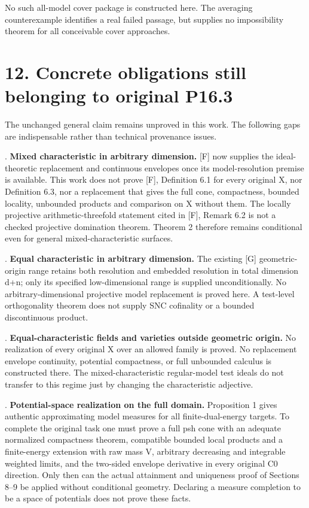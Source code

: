 \documentclass[11pt]{article}
\begin{document}
No such all-model cover package is constructed here. The averaging counterexample identifies a real failed passage, but supplies no impossibility theorem for all conceivable cover approaches.

\section*{12. Concrete obligations still belonging to original P16.3}

The unchanged general claim remains unproved in this work. The following gaps are indispensable rather than technical provenance issues.

. \textbf{Mixed characteristic in arbitrary dimension.} [F] now supplies the ideal-theoretic replacement and continuous envelopes once its model-resolution premise is available. This work does not prove [F], Definition 6.1 for every original X, nor Definition 6.3, nor a replacement that gives the full cone, compactness, bounded locality, unbounded products and comparison on X without them. The locally projective arithmetic-threefold statement cited in [F], Remark 6.2 is not a checked projective domination theorem. Theorem 2 therefore remains conditional even for general mixed-characteristic surfaces.

. \textbf{Equal characteristic in arbitrary dimension.} The existing [G] geometric-origin range retains both resolution and embedded resolution in total dimension d+n; only its specified low-dimensional range is supplied unconditionally. No arbitrary-dimensional projective model replacement is proved here. A test-level orthogonality theorem does not supply SNC cofinality or a bounded discontinuous product.

. \textbf{Equal-characteristic fields and varieties outside geometric origin.} No realization of every original X over an allowed family is proved. No replacement envelope continuity, potential compactness, or full unbounded calculus is constructed there. The mixed-characteristic regular-model test ideals do not transfer to this regime just by changing the characteristic adjective.

. \textbf{Potential-space realization on the full domain.} Proposition 1 gives authentic approximating model measures for all finite-dual-energy targets. To complete the original task one must prove a full psh cone with an adequate normalized compactness theorem, compatible bounded local products and a finite-energy extension with raw mass V, arbitrary decreasing and integrable weighted limits, and the two-sided envelope derivative in every original C0 direction. Only then can the actual attainment and uniqueness proof of Sections 8--9 be applied without conditional geometry. Declaring a measure completion to be a space of potentials does not prove these facts.
\end{document}
